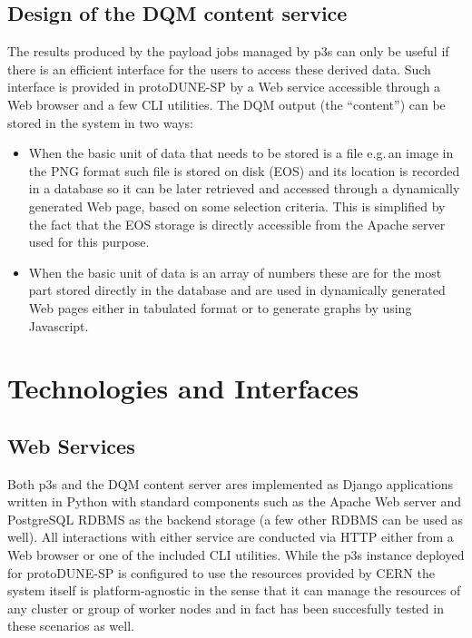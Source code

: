 \documentclass{webofc}
\newcommand{\pd}{protoDUNE\xspace}
\begin{document}
\subsection{Design of the DQM content service}
The results produced by the payload jobs managed by p3s can only be useful if there is an
efficient interface for the users to access these derived data. Such interface is provided in \pd-SP
by a Web service accessible through a Web browser and a few CLI utilities.
The DQM output (the ``content'') can be stored in the system in two ways:
\begin{itemize}

\item When the basic unit of data that needs to be stored is a file e.g.\,an image in the PNG format such
file is stored on disk (EOS) and its location is recorded in a database so it can be later retrieved
and accessed through a dynamically generated Web page,  based on some selection criteria.
This is simplified by the fact that the EOS storage is directly accessible from the Apache server
used for this purpose.

\item When the basic unit of data is an array of numbers these are for the most part stored directly
in the database and are used in dynamically generated Web pages either in tabulated format or
to generate graphs by using Javascript.

\end{itemize}



\section{Technologies and Interfaces}
\subsection{Web Services}

Both p3s and the DQM content server ares implemented as Django \cite{django} applications
written in Python
with standard components such as the Apache Web server and PostgreSQL RDBMS as the backend storage
(a few other RDBMS can be used as well). All interactions with either service
are conducted via HTTP either from a Web browser or one of the included CLI utilities.
While the p3s instance deployed for \pd-SP is configured to use
the resources provided by CERN the system itself is platform-agnostic in the sense that it can manage
the resources of any cluster or group of worker nodes and in fact has been succesfully tested
in these scenarios as well.
\end{document}
